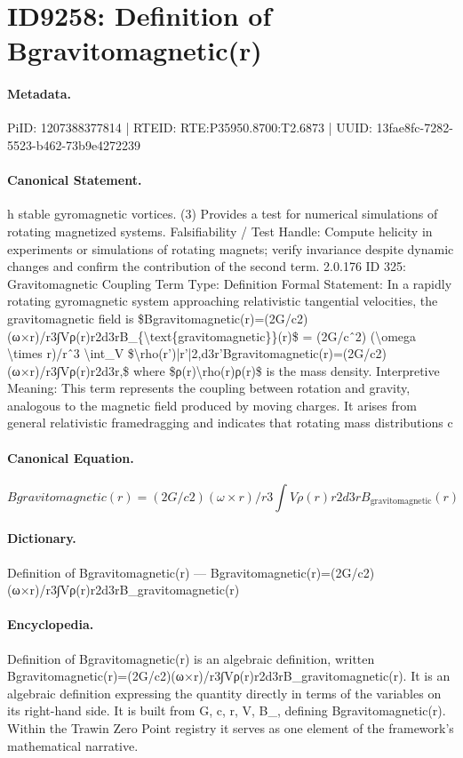 \section*{ID9258: Definition of Bgravitomagnetic(r)}
\paragraph{Metadata.}
PiID: 1207388377814 | RTEID: RTE:P35950.8700:T2.6873 | UUID: 13fae8fc-7282-5523-b462-73b9e4272239

\paragraph{Canonical Statement.}
h stable gyromagnetic vortices. (3) Provides a test for numerical simulations of rotating magnetized systems. Falsifiability / Test Handle: Compute helicity in experiments or simulations of rotating magnets; verify invariance despite dynamic changes and confirm the contribution of the second term. 2.0.176 ID 325: Gravitomagnetic Coupling Term Type: Definition Formal Statement: In a rapidly rotating gyromagnetic system approaching relativistic tangential velocities, the gravitomagnetic field is \$Bgravitomagnetic(r)=(2G/c2)(ω×r)/r3∫Vρ(r)r2d3rB\_\{\textbackslash{}text\{gravitomagnetic\}\}(r)\$ = (2G/cˆ2) (\textbackslash{}omega \textbackslash{}times r)/rˆ3 \textbackslash{}int\_V \$\textbackslash{}rho(r’)|r’|2,d3r’Bgravitomagnetic(r)=(2G/c2)(ω×r)/r3∫Vρ(r)r2d3r,\$ where \$ρ(r)\textbackslash{}rho(r)ρ(r)\$ is the mass density. Interpretive Meaning: This term represents the coupling between rotation and gravity, analogous to the magnetic field produced by moving charges. It arises from general relativistic framedragging and indicates that rotating mass distributions c

\paragraph{Canonical Equation.}
\[
Bgravitomagnetic(r)=(2G/c2)(ω×r)/r3∫Vρ(r)r2d3rB_{\text{gravitomagnetic}}(r)
\]

\paragraph{Dictionary.}
Definition of Bgravitomagnetic(r) — Bgravitomagnetic(r)=(2G/c2)(ω×r)/r3∫Vρ(r)r2d3rB\_gravitomagnetic(r)

\paragraph{Encyclopedia.}
Definition of Bgravitomagnetic(r) is an algebraic definition, written Bgravitomagnetic(r)=(2G/c2)(ω×r)/r3∫Vρ(r)r2d3rB\_gravitomagnetic(r). It is an algebraic definition expressing the quantity directly in terms of the variables on its right-hand side. It is built from G, c, r, V, B\_, defining Bgravitomagnetic(r). Within the Trawin Zero Point registry it serves as one element of the framework's mathematical narrative.
